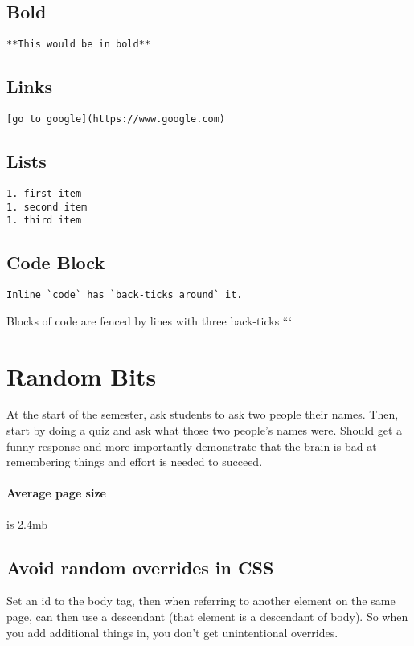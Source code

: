 \documentclass[]{article}
\newcommand{\<}{\guilsinglleft}
\renewcommand{\>}{\guilsinglright}
\begin{document}
\subsection{Bold}
\begin{lstlisting}
**This would be in bold**
\end{lstlisting}

\subsection{Links}
\begin{lstlisting}
[go to google](https://www.google.com)
\end{lstlisting}

\subsection{Lists}
\begin{lstlisting}
1. first item
1. second item
1. third item
\end{lstlisting}

\subsection{Code Block}
\begin{lstlisting}
Inline `code` has `back-ticks around` it.
\end{lstlisting}

Blocks of code are fenced by lines with three back-ticks ```


\section{Random Bits}
At the start of the semester, ask students to ask two people their names.  Then, start by doing a quiz and ask what those two people's names were.  Should get a funny response and more importantly demonstrate that the brain is bad at remembering things and effort is needed to succeed.

\paragraph{Average page size} is 2.4mb 

\subsection{Avoid random overrides in CSS}
Set an id to the body tag, then when referring to another element on the same page, can then use a descendant (that element is a descendant of body). So when  you add additional things in, you don't get unintentional overrides.
\end{document}
